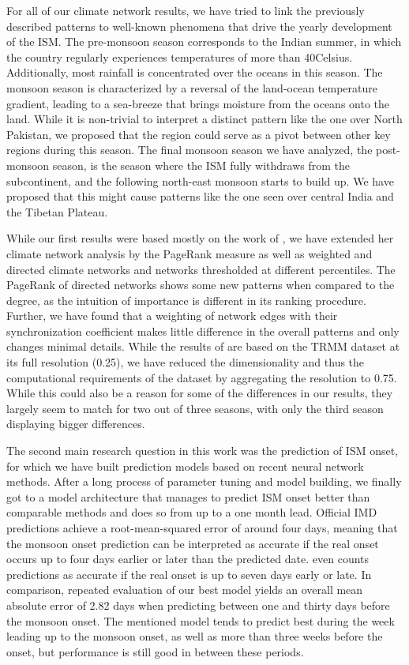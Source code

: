 For all of our climate network results, we have tried to link the previously described patterns to well-known phenomena that drive the yearly development of the ISM. The pre-monsoon season corresponds to the Indian summer, in which the country regularly experiences temperatures of more than 40\degree Celsius. Additionally, most rainfall is concentrated over the oceans in this season. The monsoon season is characterized by a reversal of the land-ocean temperature gradient, leading to a sea-breeze that brings moisture from the oceans onto the land. While it is non-trivial to interpret a distinct pattern like the one over North Pakistan, we proposed that the region could serve as a pivot between other key regions during this season. The final monsoon season we have analyzed, the post-monsoon season, is the season where the ISM fully withdraws from the subcontinent, and the following north-east monsoon starts to build up. We have proposed that this might cause patterns like the one seen over central India and the Tibetan Plateau.

While our first results were based mostly on the work of \citet{Stolbova.2015}, we have extended her climate network analysis by the PageRank measure as well as weighted and directed climate networks and networks thresholded at different percentiles. The PageRank of directed networks shows some new patterns when compared to the degree, as the intuition of importance is different in its ranking procedure. Further, we have found that a weighting of network edges with their synchronization coefficient makes little difference in the overall patterns and only changes minimal details. While the results of \citet{Stolbova.2015} are based on the TRMM dataset at its full resolution (0.25\degree), we have reduced the dimensionality and thus the computational requirements of the dataset by aggregating the resolution to 0.75\degree. While this could also be a reason for some of the differences in our results, they largely seem to match for two out of three seasons, with only the third season displaying bigger differences.

The second main research question in this work was the prediction of ISM onset, for which we have built prediction models based on recent neural network methods. After a long process of parameter tuning and model building, we finally got to a model architecture that manages to predict ISM onset better than comparable methods and does so from up to a one month lead. Official IMD predictions achieve a root-mean-squared error of around four days, meaning that the monsoon onset prediction can be interpreted as accurate if the real onset occurs up to four days earlier or later than the predicted date. \citet{Stolbova.2015} even counts predictions as accurate if the real onset is up to seven days early or late. In comparison, repeated evaluation of our best model yields an overall mean absolute error of 2.82 days when predicting between one and thirty days before the monsoon onset. The mentioned model tends to predict best during the week leading up to the monsoon onset, as well as more than three weeks before the onset, but performance is still good in between these periods.

